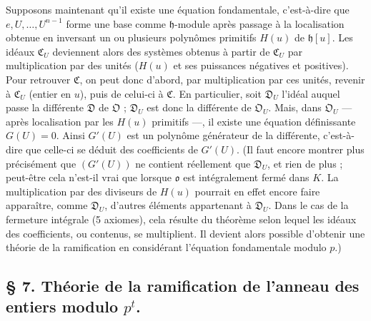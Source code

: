 Supposons maintenant qu'il existe une équation fondamentale, c'est-à-dire que $e,U,\ldots,U^{n-1}$ forme une base comme $\mathfrak h$-module après passage à la localisation obtenue en inversant un ou plusieurs polynômes primitifs $H(u)$ de $\mathfrak h[u]$. Les idéaux $\mathfrak C_U$ deviennent alors des systèmes obtenus à partir de $\mathfrak C_U$ par multiplication par des unités ($H(u)$ et ses puissances négatives et positives). Pour retrouver $\mathfrak C$, on peut donc d'abord, par multiplication par ces unités, revenir à $\mathfrak C_U$ (entier en $u$), puis de celui-ci à $\mathfrak C$. En particulier, soit $\mathfrak D_U$ l'idéal auquel passe la différente $\mathfrak D$ de $\mathfrak O$ ; $\mathfrak D_U$ est donc la différente de $\mathfrak O_U$. Mais, dans $\mathfrak O_U$ --- après localisation par les $H(u)$ primitifs ---, il existe une équation définissante $G(U)=0$. Ainsi $G'(U)$ est un polynôme générateur de la différente, c'est-à-dire que celle-ci se déduit des coefficients de $G'(U)$. (Il faut encore montrer plus précisément que $(G'(U))$ ne contient réellement que $\mathfrak D_U$, et rien de plus ; peut-être cela n'est-il vrai que lorsque $\mathfrak o$ est intégralement fermé dans $K$. La multiplication par des diviseurs de $H(u)$ pourrait en effet encore faire apparaître, comme $\mathfrak D_U$, d'autres éléments appartenant à $\mathfrak D_U$. Dans le cas de la fermeture intégrale (5 axiomes), cela résulte du théorème selon lequel les idéaux des coefficients, ou contenus, se multiplient. Il devient alors possible d'obtenir une théorie de la ramification en considérant l'équation fondamentale modulo $p$.)

\subsection*{\S{} 7. Théorie de la ramification de l'anneau des entiers modulo $p^t$.}

